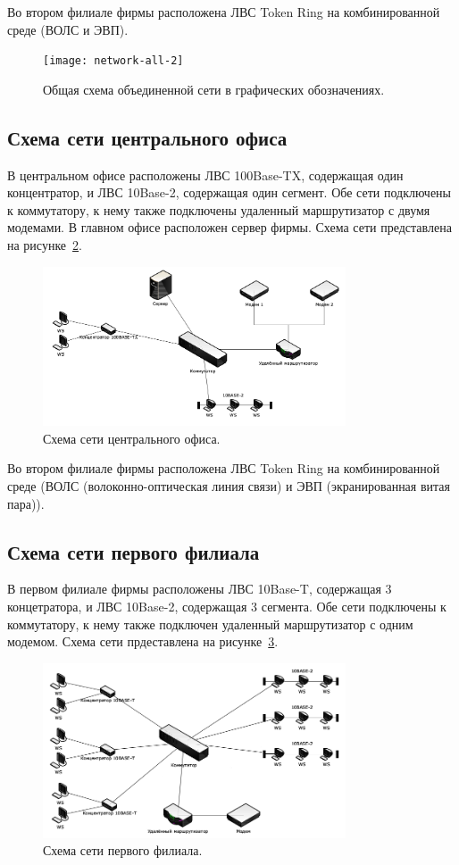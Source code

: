 \documentclass[russian,utf8,emptystyle]{eskdtext}
\begin{document}
Во втором филиале фирмы расположена ЛВС Token Ring на комбинированной среде (ВОЛС и ЭВП).

\begin{figure}[h!]
\centering
\texttt{[image: network-all-2]}
\caption{Общая схема объединенной сети в графических обозначениях.}
\label{fig:network-all-2}
\end{figure}

\clearpage
\subsection{Схема сети центрального офиса}
В центральном офисе расположены ЛВС 100Base-TX, содержащая один концентратор, и ЛВС 10Base-2, содержащая один сегмент. Обе сети подключены к коммутатору, к нему также подключены удаленный маршрутизатор с двумя модемами. В главном офисе расположен сервер фирмы. Схема сети представлена на рисунке~\ref{fig:main-ofice}.

\begin{figure}[h!]
\centering
\includegraphics[width=0.8\textwidth]{main_ofice}
\caption{Схема сети центрального офиса.}
\label{fig:main-ofice}
\end{figure}
Во втором филиале фирмы расположена ЛВС Token Ring на комбинированной среде (ВОЛС (волоконно-оптическая линия связи) и ЭВП (экранированная витая пара)). 
\clearpage
\subsection{Схема сети первого филиала}
В первом филиале фирмы расположены ЛВС 10Base-T, содержащая 3 концетратора, и ЛВС 10Base-2, содержащая 3 сегмента. Обе сети подключены к коммутатору, к нему также подключен удаленный маршрутизатор с одним модемом. Схема сети прдеставлена на рисунке~\ref{fig:filial-ofice-1}.

\begin{figure}[h!]
\centering
\includegraphics[width=0.8\textwidth]{filial_ofice_1}
\caption{Схема сети первого филиала.}
\label{fig:filial-ofice-1}
\end{figure}
\end{document}
